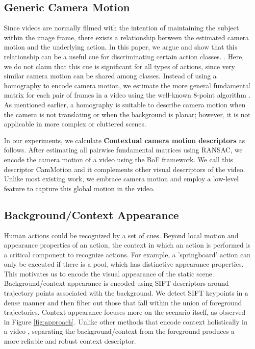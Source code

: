 \subsection{Generic Camera Motion}
Since videos are normally filmed with the intention of maintaining the subject within the image frame, there exists a relationship between the estimated camera motion and the underlying action. In this paper, we argue and show that this relationship can be a useful cue for discriminating certain action classes. . Here, we do not claim that this cue is significant for all types of actions, since very similar camera motion can be shared among classes.  Instead of using a homography to encode camera motion, we estimate the more general fundamental matrix for each pair of frames in a video using the well-known 8-point algorithm \cite{eightpoint97}. As mentioned earlier, a homography is suitable to describe camera motion when the camera is not translating or when the background is planar; however, it is not applicable in more complex or cluttered scenes.

In our experiments, we calculate \textbf{Contextual camera motion descriptors} as follows. After estimating all pairwise fundamental matrices using RANSAC, we encode the camera motion of a video using the BoF framework. We call this descriptor CamMotion and it complements other visual descriptors of the video. Unlike most existing work, we embrace camera motion and employ a low-level feature to capture this global motion in the video.


\subsection{Background/Context Appearance}
Human actions could be recognized by a set of cues. Beyond local motion and appearance properties of an action, the context in which an action is performed is a critical component to recognize actions. For example, a 'springboard' action can only be executed if there is a pool, which has distinctive appearance properties. This motivates us to encode the visual appearance of the static scene. Background/context appearance is encoded using SIFT descriptors \cite{lowe2004} around trajectory points associated with the background. We detect SIFT keypoints in a dense manner and then filter out those that fall within the union of foreground trajectories. Context appearance focuses more on the scenario itself, as observed in Figure \ref{fig:approach}.  Unlike other methods that encode context holistically in a video \cite{marszalek2009}, separating the background/context from the foreground produces a more reliable and robust context descriptor.

